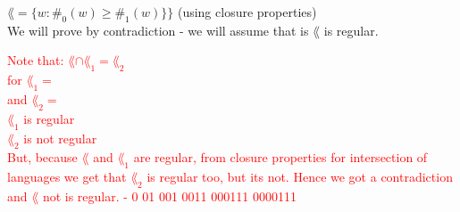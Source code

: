 $\lang=\{w : \#_0(w) \geq \#_1(w)\}\}$ (using closure properties) \\
We will prove by contradiction - we will assume that is $\lang$ is regular.

\textcolor{red}
{
    Note that: $\lang \cap \lang_1 = \lang_2$ \\
    for $\lang_1 = $ \\
    and $\lang_2 = $ \\
    $\lang_1$ is regular \\
    $\lang_2$ is not regular \\
    But, because $\lang$ and $\lang_1$ are regular, from closure properties
    for intersection of languages we get that $\lang_2$ is regular too, but its not.
    Hence we got a contradiction and $\lang$ not is regular.
    -
    0
    01
    001
    0011
    000111
    0000111 \\\\\\\\\\\\
}
\\